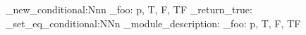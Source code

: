 \prg_new_conditional:Nnn
  \example_foo:
  { p, T, F, TF }
  { \prg_return_true: }
\prg_set_eq_conditional:NNn  %
  \_module_description:
  \example_foo:
  { p, T, F, TF }
